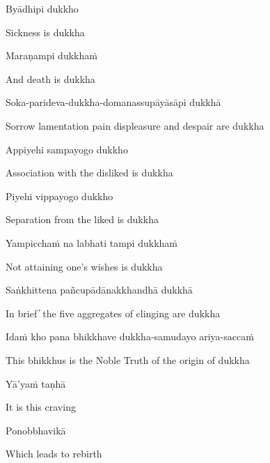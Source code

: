 Byādhipi dukkho

\begin{cprenglish}
Sickness is dukkha
\end{cprenglish}

Maraṇampi dukkhaṁ

\begin{cprenglish}
And death is dukkha
\end{cprenglish}

Soka-parideva-dukkha-domanassupāyāsāpi dukkhā

\begin{cprenglish}
Sorrow lamentation pain displeasure and despair are dukkha
\end{cprenglish}

Appiyehi sampayogo dukkho

\begin{cprenglish}
Association with the disliked is dukkha
\end{cprenglish}

Piyehi vippayogo dukkho

\begin{cprenglish}
Separation from the liked is dukkha
\end{cprenglish}

Yampicchaṁ na labhati tampi dukkhaṁ

\begin{cprenglish}
Not attaining one’s wishes is dukkha
\end{cprenglish}

Saṅkhittena pañcupādānakkhandhā dukkhā

\begin{cprenglish}
In brief  ̓  the five aggregates of clinging are dukkha
\end{cprenglish}

Idaṁ kho pana bhikkhave dukkha-samudayo ariya-saccaṁ

\begin{cprenglish}
This bhikkhus is the Noble Truth of the origin of dukkha
\end{cprenglish}

Yā’yaṁ taṇhā

\begin{cprenglish}
It is this craving
\end{cprenglish}

Ponobbhavikā

\begin{cprenglish}
Which leads to rebirth
\end{cprenglish}

